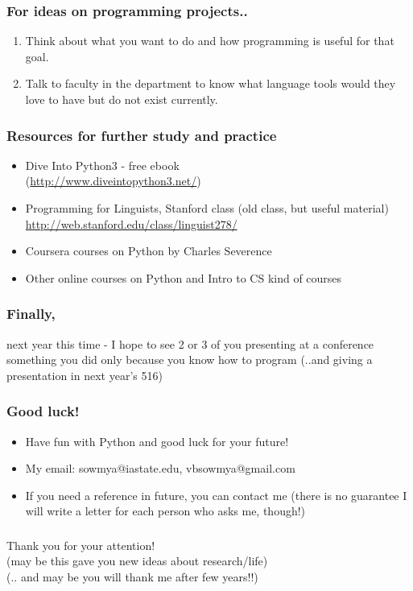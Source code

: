 \documentclass{beamer}
\begin{document}
\begin{frame}
\frametitle{For ideas on programming projects..}
\begin{enumerate}
\item Think about what you want to do and how programming is useful for that goal.
\item Talk to faculty in the department to know what language tools would they love to have but do not exist currently.
\end{enumerate}
\end{frame}

\begin{frame}
\frametitle{Resources for further study and practice}
\begin{itemize}
\item Dive Into Python3 - free ebook \\ (\url{http://www.diveintopython3.net/})
\item Programming for Linguists, Stanford class (old class, but useful material) \\ \url{http://web.stanford.edu/class/linguist278/}
\item Coursera courses on Python by Charles Severence
\item Other online courses on Python and Intro to CS kind of courses
\end{itemize}
\end{frame}

\begin{frame}
\frametitle{Finally, }
next year this time - I hope to see 2 or 3 of you presenting at a conference something you did only because you know how to program (..and giving a presentation in next year's 516)
\end{frame}

\begin{frame}
\frametitle{Good luck!}
\begin{itemize}
\item Have fun with Python and good luck for your future!
\item My email: sowmya@iastate.edu, vbsowmya@gmail.com 
\item If you need a reference in future, you can contact me (there is no guarantee I will write a letter for each person who asks me, though!)
\end{itemize}
\end{frame}

\begin{frame}
\frametitle{}
\centering
\Large Thank you for your attention! \\
\bigskip 
(may be this gave you new ideas about research/life)  \\
\bigskip
(.. and may be you will thank me after few years!!)
\end{frame}
\end{document}

